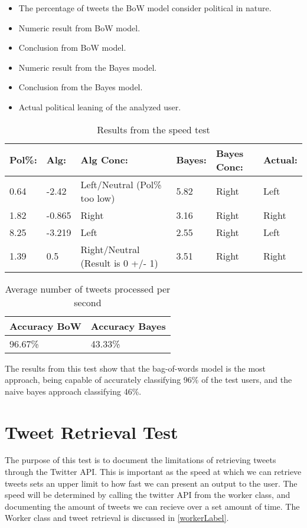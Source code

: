 \begin{itemize}
  \item The percentage of tweets the BoW model
consider political in nature.
\item Numeric result from BoW model.
\item Conclusion from BoW model.
\item Numeric result from the Bayes model.
\item Conclusion from the Bayes model.
\item Actual political leaning of the analyzed user.
\end{itemize}

\begin{table}[H]\centering
\begin{tabular}{|l|l|l|l|l|l|}
\hline
\textbf{Pol\%:}	&	\textbf{Alg:}	&	\textbf{Alg Conc:}							&	\textbf{Bayes:}	&
\textbf{Bayes Conc:}
& \textbf{Actual:}
\\\hline 0.64	&	-2.42	&	Left/Neutral (Pol\% too low)		&	5.82	&	Right		&	Left	\\\hline
1.82	&	-0.865	&	Right								&	3.16	&	Right		&	Right	\\\hline
8.25	&	-3.219	&	Left								&	2.55	&	Right		&	Left	\\\hline
1.39	&	0.5		&	Right/Neutral (Result is 0 +/- 1)	&	3.51	&	Right		&	Right	\\\hline
\end{tabular}
\caption{Results from the speed test}
\label{speedTestReslabel}
\end{table}

\begin{table}[H]\centering
\begin{tabular}{|l|l|}\hline
\textbf{Accuracy BoW}	&	\textbf{Accuracy Bayes}	\\\hline
96.67\%					&	43.33\%					\\\hline	
\end{tabular}
\caption{Average number of tweets processed per second}
\label{AccPercent}
\end{table}

The results from this test show that the bag-of-words model is the most
approach, being capable of accurately classifying 96\% of the test users, and
the naive bayes approach classifying 46\%.


\section{Tweet Retrieval Test}
The purpose of this test is to document the limitations of retrieving tweets
through the Twitter API. This is important as the speed at which we can retrieve
tweets sets an upper limit to how fast we can present an output to the user.
The speed will be determined by calling the twitter API from the worker class,
and documenting the amount of tweets we can recieve over a set amount of time.
The Worker class and tweet retrieval is discussed in \autoref{workerLabel}.

